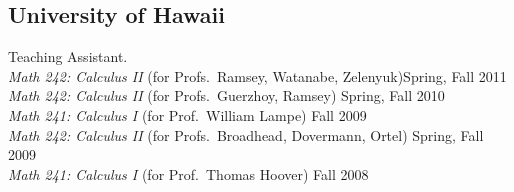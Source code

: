 \subsection*{University of Hawaii} Teaching Assistant.\\[3pt]
\textsl{Math 242: Calculus II} (for Profs.~Ramsey, Watanabe, Zelenyuk)\hfill  Spring, Fall 2011\\[\Xpt]
\textsl{Math 242: Calculus II} (for Profs.~Guerzhoy, Ramsey) \hfill  Spring, Fall 2010\\[\Xpt]
\textsl{Math 241: Calculus I} (for Prof.~William Lampe) \hfill Fall 2009\\[\Xpt]
\textsl{Math 242: Calculus II} (for Profs.~Broadhead, Dovermann, Ortel) \hfill Spring, Fall 2009\\[\Xpt]
\textsl{Math 241: Calculus I} (for Prof.~Thomas Hoover)  \hfill Fall 2008



